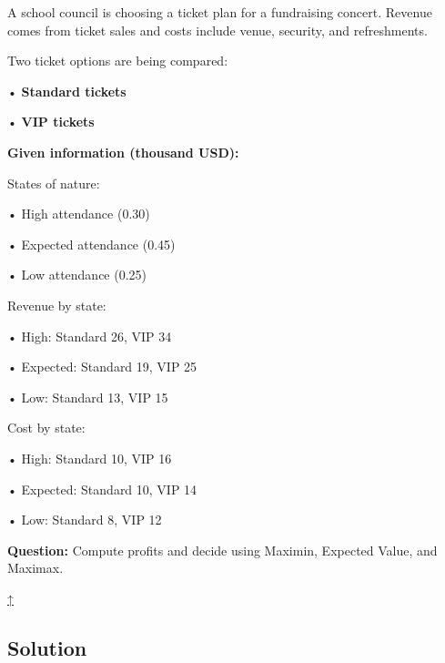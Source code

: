 \documentclass[11pt]{article}
\begin{document}
	\label{problem2-problem}
	
	A school council is choosing a ticket plan for a fundraising concert. Revenue comes from ticket sales and costs include
	venue, security, and refreshments.
	
	
	
	
	
	
	Two ticket options are being compared:
	
	
	
	• \textbf{Standard tickets}
	
	
	
	• \textbf{VIP tickets}
	
	
	
	
	
	\textbf{Given information (thousand USD):}
	
	
	
	States of nature:
	
	
	
	• High attendance (0.30)
	
	
	
	• Expected attendance (0.45)
	
	
	
	• Low attendance (0.25)
	
	
	
	
	
	Revenue by state:
	
	
	
	• High: Standard 26, VIP 34
	
	
	
	• Expected: Standard 19, VIP 25
	
	
	
	• Low: Standard 13, VIP 15
	
	
	
	
	
	Cost by state:
	
	
	
	• High: Standard 10, VIP 16
	
	
	
	• Expected: Standard 10, VIP 14
	
	
	
	• Low: Standard 8, VIP 12
	
	
	
	
	
	
	\textbf{Question:} Compute profits and decide using Maximin, Expected Value, and Maximax.
	
	\hyperref[problem2-criteria]{↑}
	
	\subsection*{Solution}
	
\end{document}
